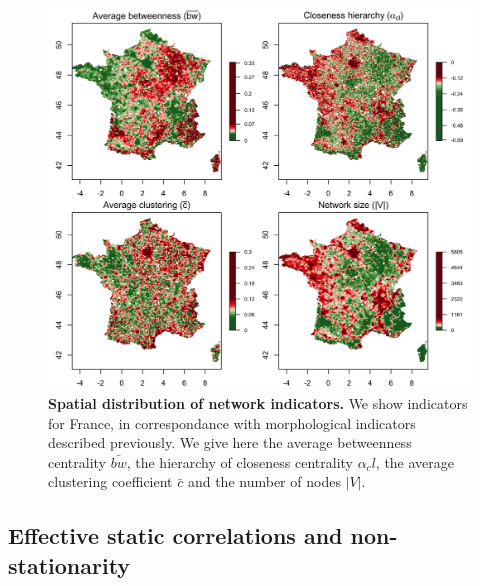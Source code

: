 


\begin{figure}
\includegraphics[width=\linewidth]{figures/indics_network_en_areasize100_offset50_factor0_5.png}
\caption{\textbf{Spatial distribution of network indicators.} We show indicators for France, in correspondance with morphological indicators described previously. We give here the average betweenness centrality $\bar{bw}$, the hierarchy of closeness centrality $\alpha_cl$, the average clustering coefficient $\bar{c}$ and the number of nodes $\left|V\right|$.\label{fig:staticcorrs:network}}
\end{figure}


\subsection{Effective static correlations and non-stationarity}


